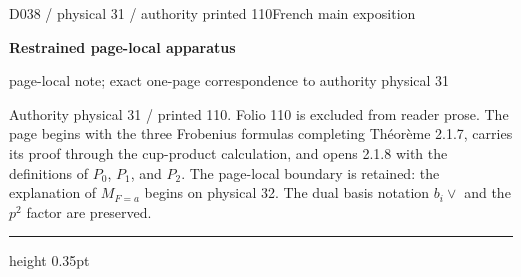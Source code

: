 \documentclass[9pt]{article}
\newcommand{\CanonText}[1]{\par{\fontsize{8.0}{9.35}\selectfont\RaggedRight #1\par}\vspace{2.2pt}}
\newcommand{\LayerTitle}{Restrained page-local apparatus}
\begin{document}
\noindent\begin{minipage}[t][\dimexpr\textheight-5pt\relax][t]{\textwidth}
{\sffamily\fontsize{7.3}{8.2}\selectfont\color{Quiet} D038 / physical 31 / authority printed 110\hfill French main exposition}
\par{}\vspace{4.5pt}
{\sffamily\fontsize{10.4}{11.6}\selectfont\bfseries\color{Accent} \LayerTitle}
\par{\sffamily\fontsize{6.7}{7.7}\selectfont\color{Quiet} page-local note; exact one-page correspondence to authority physical 31}
\vspace{5pt}
\CanonText{Authority physical 31 / printed 110. Folio 110 is excluded from reader prose. The page begins with the three Frobenius formulas completing Théorème 2.1.7, carries its proof through the cup-product calculation, and opens 2.1.8 with the definitions of \(P_{0}\), \(P_{1}\), and \(P_{2}\). The page-local boundary is retained: the explanation of \(M_{F=a}\) begins on physical 32. The dual basis notation \(b_{i}\vee{}\) and the \(p^{2}\) factor are preserved.}
\vfill
{\color{Accent}\hrule height 0.35pt}\vspace{3pt}
\end{minipage}
\newpage
\end{document}
